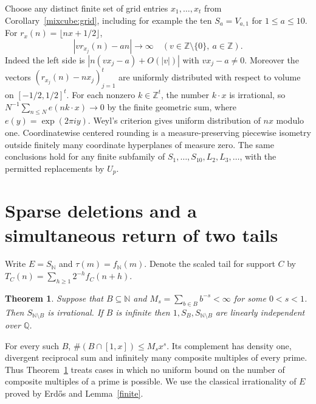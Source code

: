 \documentclass[11pt,letterpaper]{article}
\newtheorem{theorem}{Theorem}[section]
\newcommand{\Q}{\mathbb Q}
\newcommand{\N}{\mathbb N}
\begin{document}
Choose any distinct finite set of grid entries $x_1,\ldots,x_t$
from Corollary~\ref{mixcube:grid}, including for example the ten
$S_a=V_{a,1}$ for $1\le a\le10$. For $r_x(n)=\lfloor nx+1/2\rfloor$,
\[
 |v r_{x_j}(n)-an|\longrightarrow\infty
 \quad(v\in\mathbb Z\setminus\{0\},\ a\in\mathbb Z).
\]
Indeed the left side is $|n(vx_j-a)+O(|v|)|$ with $vx_j-a\ne0$.
Moreover the vectors $(r_{x_j}(n)-nx_j)_{j=1}^{t}$ are uniformly
distributed with respect to volume on $[-1/2,1/2]^t$. For each
nonzero $k\in\mathbb Z^t$, the number $k\cdot x$ is irrational, so
$N^{-1}\sum_{n\le N}e(nk\cdot x)\to0$ by the finite geometric
sum, where $e(y)=\exp(2\pi i y)$. Weyl's criterion gives uniform
distribution of $nx$ modulo one. Coordinatewise centered rounding is
a measure-preserving piecewise isometry outside finitely many
coordinate hyperplanes of measure zero. The same conclusions hold for
any finite subfamily of $S_1,\ldots,S_{10},L_2,L_3,\ldots$, with the
permitted replacements by $U_p$.


\section{Sparse deletions and a simultaneous return of two tails}
\label{sec:crtreturn}
Write $E=S_{\mathbb N}$ and $\tau(m)=f_{\mathbb N}(m)$. Denote the
scaled tail for support $C$ by $T_C(n)=\sum_{h\ge1}2^{-h}f_C(n+h)$.

\begin{theorem}\label{crt:main}
Suppose that $B\subseteq\N$ and $M_s=\sum_{b\in B}b^{-s}<\infty$ for some $0<s<1$. Then $S_{\N\setminus B}$ is irrational. If $B$ is infinite then $1,S_B,S_{\N\setminus B}$ are linearly independent over $\Q$.
\end{theorem}
For every such $B$, $\#(B\cap[1,x])\le M_s x^s$. Its complement has density one, divergent reciprocal sum and infinitely many composite multiples of every prime. Thus Theorem~\ref{crt:main} treats cases in which no uniform bound on the number of composite multiples of a prime is possible. We use the classical irrationality of $E$ proved by Erd\H{o}s \cite{erdos} and Lemma~\ref{finite}.
\end{document}
